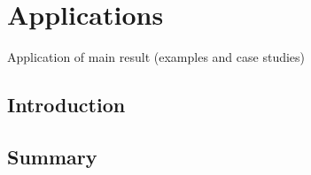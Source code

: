 \chapter{Applications}

Application of main result (examples and case studies)

\section{Introduction}

\section{Summary}
